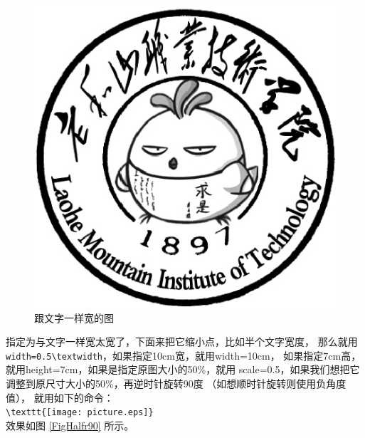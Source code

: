\begin{figure}[htb]
\centering
\includegraphics[width=\textwidth]{./Pictures/LHS.eps}
\caption{跟文字一样宽的图}
\label{FigTextWidth}
\end{figure}

指定为与文字一样宽太宽了，下面来把它缩小点，比如半个文字宽度，
那么就用\verb+width=0.5\textwidth+，如果指定10cm宽，就用width=10cm，
如果指定7cm高，就用height=7cm，如果是指定原图大小的50\%，就用
scale=0.5，如果我们想把它调整到原尺寸大小的50\%，再逆时针旋转90度
（如想顺时针旋转则使用负角度值），
就用如下的命令：\\
\verb+\texttt{[image: picture.eps]}+\\
效果如图 \ref{FigHalfr90} 所示。

